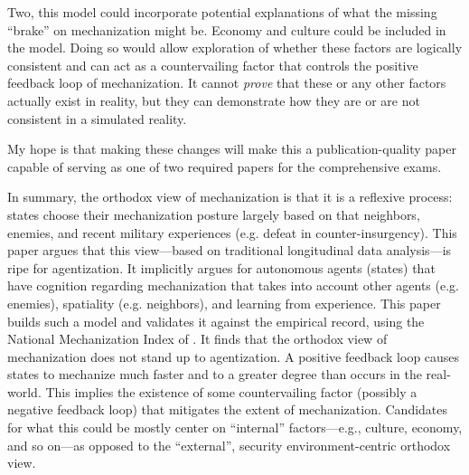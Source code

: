 \documentclass{article}
\begin{document}
Two, this model could incorporate potential explanations of what the missing
``brake'' on mechanization might be. Economy and culture could be included in
the model. Doing so would allow exploration of whether these factors are
logically consistent and can act as a countervailing factor that controls the
positive feedback loop of mechanization. It cannot \textit{prove} that these or
any other factors actually exist in reality, but they can demonstrate how they
are or are not consistent in a simulated reality.

My hope is that making these changes will make this a publication-quality paper
capable of serving as one of two required papers for the comprehensive exams.

\newpage

\printbibliography[heading=bibnumbered]

In summary, the orthodox view of mechanization is that it is a
reflexive process: states choose their mechanization posture largely based on
that neighbors, enemies, and recent military experiences (e.g. defeat in
counter-insurgency). This paper argues
that this view---based on traditional longitudinal data analysis---is ripe for
agentization. It implicitly argues for autonomous agents (states) that have
cognition regarding mechanization that takes into account other agents (e.g.
enemies), spatiality (e.g. neighbors), and learning from experience. This paper
builds such a model and validates it against the empirical record, using the
National Mechanization Index of \citet{sechser2010army}. It finds that the 
orthodox view of mechanization does not stand up to agentization. A positive feedback loop 
causes states to
mechanize much faster and to a greater degree than occurs in the real-world.
This implies the existence of some countervailing factor (possibly a negative
feedback loop) that mitigates the extent of mechanization. Candidates for what
this could be mostly center on ``internal'' factors---e.g., culture, economy,
and so on---as opposed to the ``external'', security environment-centric
orthodox view.
\end{document}

